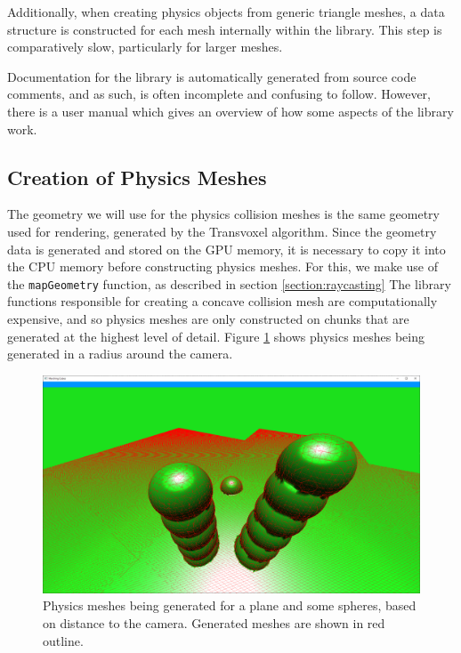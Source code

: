 \documentclass{article}
\begin{document}
Additionally, when creating physics objects from generic triangle meshes, a data structure is constructed for each mesh internally within the library. This step is comparatively slow, particularly for larger meshes.

Documentation for the library is automatically generated from source code comments, and as such, is often incomplete and confusing to follow. However, there is a user manual which gives an overview of how some aspects of the library work\cite{coumans_2015}.

\subsection{Creation of Physics Meshes}

The geometry we will use for the physics collision meshes is the same geometry used for rendering, generated by the Transvoxel algorithm. Since the geometry data is generated and stored on the GPU memory, it is necessary to copy it into the CPU memory before constructing physics meshes. For this, we make use of the \texttt{mapGeometry} function, as described in section \ref{section:raycasting}
The library functions responsible for creating a concave collision mesh are computationally expensive, and so physics meshes are only constructed on chunks that are generated at the highest level of detail. Figure \ref{fig:meshes1} shows physics meshes being generated in a radius around the camera.

\begin{figure}[H]
  \includegraphics[width=\textwidth]{meshes1.png}
  \caption{Physics meshes being generated for a plane and some spheres, based on distance to the camera. Generated meshes are shown in red outline.}
  \label{fig:meshes1}
\end{figure}
\end{document}
